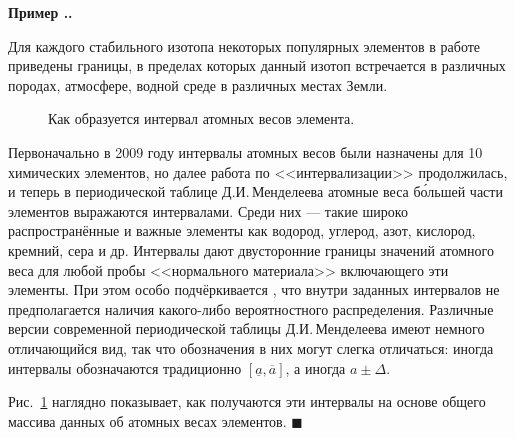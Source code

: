 \documentclass[a5paper,openany]{book}
\newcommand{\ov}{\overline}
\newcommand{\un}{\underline}
\newcounter{ExmpNum}[section]
\renewcommand{\theExmpNum}{\thesection.\arabic{ExmpNum}}
\newenvironment{example}%
  {\refstepcounter{ExmpNum}%
  \par\addvspace{\medskipamount} 
  \noindent\textbf{Пример {\theExmpNum}.}
  }%
  {\hfill$\blacksquare$\par\medskip}
\begin{document}
\begin{example}
  
Для каждого стабильного изотопа некоторых популярных элементов в работе \cite{IUPAC-2016}
приведены границы, в пределах которых данный изотоп встречается в различных породах, 
атмосфере, водной среде в различных местах Земли. 
  
  
\begin{figure}[ht]
\centering\small
  \unitlength=1mm
\caption{Как образуется интервал атомных весов элемента.} 
\label{AtomHystPic} 
\end{figure} 
   
  
Первоначально в 2009 году интервалы атомных весов были назначены для 10 химических 
элементов, но далее работа по <<интервализации>> продолжилась, и теперь в периодической 
таблице Д.И.\,Менделеева атомные веса б\'{о}льшей части элементов выражаются интервалами. 
Среди них --- такие широко распространённые и важные элементы как водород, углерод, азот, 
кислород, кремний, сера и др. Интервалы дают двусторонние границы значений атомного веса 
для любой пробы <<нормального материала>> включающего эти элементы. При этом особо 
подчёркивается \cite{IUPAC-2016}, что внутри заданных интервалов не предполагается 
наличия какого-либо вероятностного распределения. Различные версии современной 
периодической таблицы Д.И.\,Менделеева имеют немного отличающийся вид, так что 
обозначения в них могут слегка отличаться: иногда интервалы обозначаются традиционно 
$[\un{a}, \ov{a}]$, а иногда $a\pm\Delta$. 
  
Рис.~\ref{AtomHystPic} наглядно показывает, как получаются эти интервалы на основе 
общего массива данных об атомных весах элементов. 
\end{example} 
  
  
\end{document}
